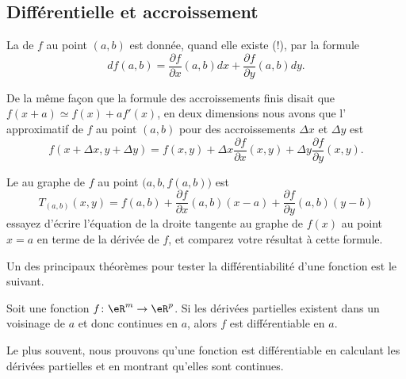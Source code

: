 \subsection{Différentielle et accroissement}

La  de $f$ au point $(a,b)$ est donnée, quand elle existe (!), par la formule
\begin{equation}
	df(a,b) = \frac{\partial f}{\partial x}(a,b)dx + \frac{\partial f}{\partial y}(a,b) dy.
\end{equation}

De la même façon que la formule des accroissements finis disait que $f(x+a)\simeq f(x)+af'(x)$, en deux dimensions nous avons que l' approximatif de $f$ au point $(a,b)$ pour des accroissements $\Delta x$ et $\Delta y$ est 
\begin{equation}
	f(x+\Delta x,y+\Delta y)=f(x,y)+\Delta x\frac{ \partial f }{ \partial x }(x,y)+\Delta y\frac{ \partial f }{ \partial y }(x,y).
\end{equation}

Le  au graphe de $f$ au point $\big(a,b,f(a,b)\big)$ est 
\begin{equation}
	T_{(a,b)}(x,y) = f(a,b) + \frac{\partial f}{\partial x}(a,b) (x-a) + \frac{\partial f}{\partial y}(a,b) (y-b)
\end{equation}
essayez d'écrire l'équation de la droite tangente au graphe de $f(x)$ au point $x=a$ en terme de la dérivée de $f$, et comparez votre résultat à cette formule.

Un des principaux théorèmes pour tester la différentiabilité d'une fonction est le suivant.

\begin{theorem}		\label{ThoProuverDiffable}
	Soit une fonction $f\colon \eR^m\to \eR^p$. Si les dérivées partielles existent dans un voisinage de $a$ et donc continues en $a$, alors $f$ est différentiable en $a$.
\end{theorem}
Le plus souvent, nous prouvons qu'une fonction est différentiable en calculant les dérivées partielles et en montrant qu'elles sont continues.

